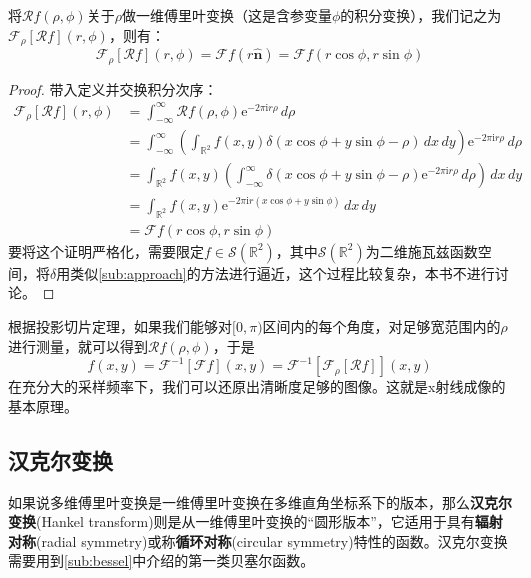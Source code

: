 \begin{theorem}[投影切片定理]
    将$\mathcal{R} f(\rho,\phi)$关于$\rho$做一维傅里叶变换（这是含参变量$\phi$的积分变换），我们记之为$\mathcal{F} _{\rho}[\mathcal{R} f](r,\phi)$，则有：
    \[\mathcal{F} _{\rho}[\mathcal{R} f](r,\phi)=\mathcal{F} f(r\hat{\mathbf{n}})=\mathcal{F} f(r\cos\phi,r\sin\phi)\]
\end{theorem}
\begin{proof}
    带入定义并交换积分次序：
    \begin{align*}
        \mathcal{F} _{\rho}[\mathcal{R} f](r,\phi)&=\int_{-\infty}^{\infty}\mathcal{R} f(\rho,\phi)\mathrm{e}^{-2\pi \mathrm{i} r \rho}\,d\rho\\
        &=\int_{-\infty}^{\infty}\left(\int_{\mathbb{R}^2}f(x,y)\delta(x\cos\phi+y\sin\phi-\rho)\,dx\,dy\right)\mathrm{e}^{-2\pi \mathrm{i} r \rho}\,d\rho\\
        &=\int_{\mathbb{R}^2}f(x,y)\left(\int_{-\infty}^{\infty}\delta(x\cos\phi+y\sin\phi-\rho)\mathrm{e}^{-2\pi \mathrm{i} r \rho}\,d\rho\right)\,dx\,dy\\
        &=\int_{\mathbb{R}^2}f(x,y)\mathrm{e}^{-2\pi \mathrm{i} r (x\cos\phi+y\sin\phi)}\,dx\,dy\\
        &=\mathcal{F} f(r\cos\phi,r\sin\phi)
    \end{align*}
    要将这个证明严格化，需要限定$f\in\mathcal{S} (\mathbb{R}^2)$，其中$\mathcal{S} (\mathbb{R}^2)$为二维施瓦兹函数空间，将$\delta$用类似\ref{sub:approach}的方法进行逼近，这个过程比较复杂，本书不进行讨论。
\end{proof}

根据投影切片定理，如果我们能够对$[0,\pi)$区间内的每个角度，对足够宽范围内的$\rho$进行测量，就可以得到$\mathcal{R} f(\rho,\phi)$，于是
\[f(x,y)=\mathcal{F} ^{-1}[\mathcal{F} f](x,y)=\mathcal{F} ^{-1}[\mathcal{F} _{\rho}[\mathcal{R} f]](x,y)\]
在充分大的采样频率下，我们可以还原出清晰度足够的图像。这就是x射线成像的基本原理。

\subsection{汉克尔变换}\label{sub:hankel}

如果说多维傅里叶变换是一维傅里叶变换在多维直角坐标系下的版本，那么\textbf{汉克尔变换}(Hankel transform)则是从一维傅里叶变换的“圆形版本”，它适用于具有\textbf{辐射对称}(radial symmetry)或称\textbf{循环对称}(circular symmetry)特性的函数。汉克尔变换需要用到\ref{sub:bessel}中介绍的第一类贝塞尔函数。

